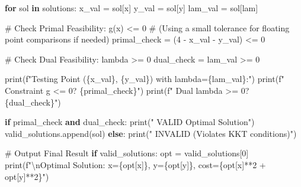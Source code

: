 \documentclass[
  letterpaper,
  DIV=11,
  numbers=noendperiod]{scrreprt}
\newenvironment{Shaded}{\begin{snugshade}}{\end{snugshade}}
\newcommand{\BuiltInTok}[1]{\textcolor[rgb]{0.00,0.23,0.31}{#1}}
\newcommand{\CharTok}[1]{\textcolor[rgb]{0.13,0.47,0.30}{#1}}
\newcommand{\CommentTok}[1]{\textcolor[rgb]{0.37,0.37,0.37}{#1}}
\newcommand{\ControlFlowTok}[1]{\textcolor[rgb]{0.00,0.23,0.31}{\textbf{#1}}}
\newcommand{\DecValTok}[1]{\textcolor[rgb]{0.68,0.00,0.00}{#1}}
\newcommand{\KeywordTok}[1]{\textcolor[rgb]{0.00,0.23,0.31}{\textbf{#1}}}
\newcommand{\NormalTok}[1]{\textcolor[rgb]{0.00,0.23,0.31}{#1}}
\newcommand{\OperatorTok}[1]{\textcolor[rgb]{0.37,0.37,0.37}{#1}}
\newcommand{\SpecialCharTok}[1]{\textcolor[rgb]{0.37,0.37,0.37}{#1}}
\newcommand{\SpecialStringTok}[1]{\textcolor[rgb]{0.13,0.47,0.30}{#1}}
\newcommand{\StringTok}[1]{\textcolor[rgb]{0.13,0.47,0.30}{#1}}
\begin{document}
\begin{Shaded}
\begin{Highlighting}[]
\ControlFlowTok{for}\NormalTok{ sol }\KeywordTok{in}\NormalTok{ solutions:}
\NormalTok{    x\_val }\OperatorTok{=}\NormalTok{ sol[x]}
\NormalTok{    y\_val }\OperatorTok{=}\NormalTok{ sol[y]}
\NormalTok{    lam\_val }\OperatorTok{=}\NormalTok{ sol[lam]}
    
    \CommentTok{\# Check Primal Feasibility: g(x) \textless{}= 0}
    \CommentTok{\# (Using a small tolerance for floating point comparisons if needed)}
\NormalTok{    primal\_check }\OperatorTok{=}\NormalTok{ (}\DecValTok{4} \OperatorTok{{-}}\NormalTok{ x\_val }\OperatorTok{{-}}\NormalTok{ y\_val) }\OperatorTok{\textless{}=} \DecValTok{0}
    
    \CommentTok{\# Check Dual Feasibility: lambda \textgreater{}= 0}
\NormalTok{    dual\_check }\OperatorTok{=}\NormalTok{ lam\_val }\OperatorTok{\textgreater{}=} \DecValTok{0}
    
    \BuiltInTok{print}\NormalTok{(}\SpecialStringTok{f"Testing Point (}\SpecialCharTok{\{}\NormalTok{x\_val}\SpecialCharTok{\}}\SpecialStringTok{, }\SpecialCharTok{\{}\NormalTok{y\_val}\SpecialCharTok{\}}\SpecialStringTok{) with lambda=}\SpecialCharTok{\{}\NormalTok{lam\_val}\SpecialCharTok{\}}\SpecialStringTok{:"}\NormalTok{)}
    \BuiltInTok{print}\NormalTok{(}\SpecialStringTok{f"  Constraint g \textless{}= 0? }\SpecialCharTok{\{}\NormalTok{primal\_check}\SpecialCharTok{\}}\SpecialStringTok{"}\NormalTok{)}
    \BuiltInTok{print}\NormalTok{(}\SpecialStringTok{f"  Dual lambda \textgreater{}= 0? }\SpecialCharTok{\{}\NormalTok{dual\_check}\SpecialCharTok{\}}\SpecialStringTok{"}\NormalTok{)}
    
    \ControlFlowTok{if}\NormalTok{ primal\_check }\KeywordTok{and}\NormalTok{ dual\_check:}
        \BuiltInTok{print}\NormalTok{(}\StringTok{" VALID Optimal Solution"}\NormalTok{)}
\NormalTok{        valid\_solutions.append(sol)}
    \ControlFlowTok{else}\NormalTok{:}
        \BuiltInTok{print}\NormalTok{(}\StringTok{" INVALID (Violates KKT conditions)"}\NormalTok{)}

\CommentTok{\# Output Final Result}
\ControlFlowTok{if}\NormalTok{ valid\_solutions:}
\NormalTok{    opt }\OperatorTok{=}\NormalTok{ valid\_solutions[}\DecValTok{0}\NormalTok{]}
    \BuiltInTok{print}\NormalTok{(}\SpecialStringTok{f"}\CharTok{\textbackslash{}n}\SpecialStringTok{Optimal Solution: x=}\SpecialCharTok{\{}\NormalTok{opt[x]}\SpecialCharTok{\}}\SpecialStringTok{, y=}\SpecialCharTok{\{}\NormalTok{opt[y]}\SpecialCharTok{\}}\SpecialStringTok{, cost=}\SpecialCharTok{\{}\NormalTok{opt[x]}\OperatorTok{**}\DecValTok{2} \OperatorTok{+}\NormalTok{ opt[y]}\OperatorTok{**}\DecValTok{2}\SpecialCharTok{\}}\SpecialStringTok{"}\NormalTok{)}
\end{Highlighting}
\end{Shaded}
\end{document}
